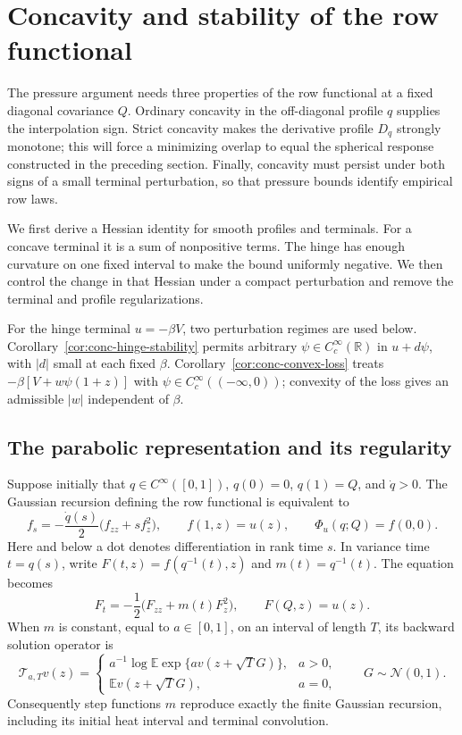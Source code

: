 \documentclass[11pt,a4paper]{article}
\numberwithin{equation}{section}
\theoremstyle{definition}
\theoremstyle{remark}
\newcommand{\E}{\mathbb E}
\newcommand{\R}{\mathbb R}
\newcommand{\cN}{\mathcal N}
\begin{document}
\section{Concavity and stability of the row functional}
\label{sec:row-concavity}

The pressure argument needs three properties of the row functional at a
fixed diagonal covariance $Q$.  Ordinary concavity in the off-diagonal
profile $q$ supplies the interpolation sign.  Strict concavity makes the
derivative profile $D_q$ strongly monotone; this will force a minimizing
overlap to equal the spherical response constructed in the preceding
section.  Finally, concavity must persist under both signs of a small
terminal perturbation, so that pressure bounds identify empirical row laws.

We first derive a Hessian identity for smooth profiles and terminals.
For a concave terminal it is a sum of nonpositive terms.  The hinge has
enough curvature on one fixed interval to make the bound uniformly
negative.  We then control the change in that Hessian under a compact
perturbation and remove the terminal and profile regularizations.

For the hinge terminal $u=-\beta V$, two perturbation regimes are used
below. Corollary~\ref{cor:conc-hinge-stability} permits arbitrary
$\psi\in C_c^\infty(\R)$ in $u+d\psi$, with $|d|$ small at each fixed
$\beta$. Corollary~\ref{cor:conc-convex-loss} treats
$-\beta[V+w\psi(1+z)]$ with $\psi\in C_c^\infty(( -\infty,0))$;
convexity of the loss gives an admissible $|w|$ independent of $\beta$.

\subsection{The parabolic representation and its regularity}

Suppose initially that $q\in C^\infty([0,1])$, $q(0)=0$, $q(1)=Q$, and
$\dot q>0$.  The Gaussian recursion defining the row functional is equivalent
to
\begin{equation}
 f_s=-\frac{\dot q(s)}2\bigl(f_{zz}+s f_z^2\bigr),
 \qquad f(1,z)=u(z),\qquad \Phi_u(q;Q)=f(0,0).
 \label{eq:src4}
\end{equation}
Here and below a dot denotes differentiation in rank time $s$.  In variance
time $t=q(s)$, write $F(t,z)=f(q^{-1}(t),z)$ and $m(t)=q^{-1}(t)$.  The equation
becomes
\begin{equation}
 F_t=-\frac12\bigl(F_{zz}+m(t)F_z^2\bigr),\qquad F(Q,z)=u(z).
 \label{eq:conc-variance-pde}
\end{equation}
When $m$ is constant, equal to $a\in[0,1]$, on an interval of length $T$, its
backward solution operator is
\[
 \mathcal T_{a,T}v(z)=
 \begin{cases}
 a^{-1}\log\E\exp\{a v(z+\sqrt T G)\},&a>0,\\
 \E v(z+\sqrt T G),&a=0,
 \end{cases}
 \qquad G\sim\cN(0,1).
\]
Consequently step functions $m$ reproduce exactly the finite Gaussian
recursion, including its initial heat interval and terminal convolution.
\end{document}
